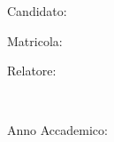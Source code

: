 \begin{titlepage}
\begin{center}
        \large \mySubTitle 
        
        \vfill
        
        \normalsize Candidato: \\
        \Large \spacedlowsmallcaps{\myName}
        
        \normalsize Matricola: \\
        \Large {}
        
        \bigskip
        
        \normalsize Relatore: \\
        \Large {}

        \vfill ~ \vfill ~ \vfill
        
        \normalsize Anno Accademico: \\
        \Large {}


                   

    \end{center}        

\end{titlepage} 